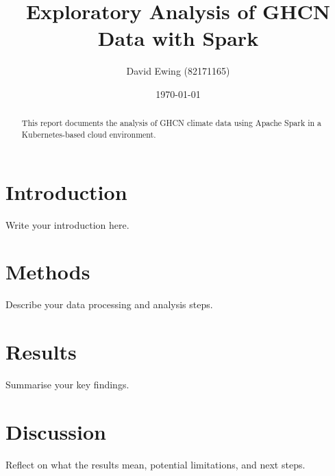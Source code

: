 \documentclass[a4paper,11pt]{article}
\title{Exploratory Analysis of GHCN Data with Spark}
\author{David Ewing (82171165) }
\date{\today}
\begin{document}
\maketitle

\begin{abstract}
This report documents the analysis of GHCN climate data using Apache Spark in a Kubernetes-based cloud environment.
\end{abstract}

\section{Introduction}
Write your introduction here.

\section{Methods}
Describe your data processing and analysis steps.

\section{Results}
Summarise your key findings.

\section{Discussion}
Reflect on what the results mean, potential limitations, and next steps.



\end{document}
